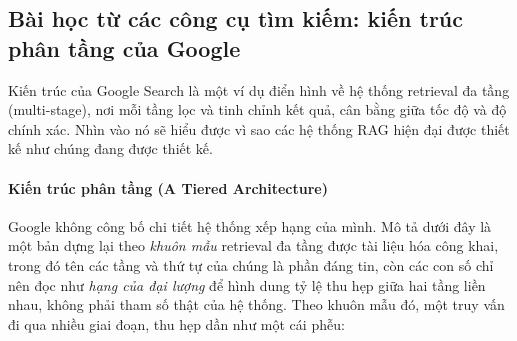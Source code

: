 \subsection{Bài học từ các công cụ tìm kiếm: kiến trúc phân tầng của Google}
\label{ssec:lesson_from_google}
Kiến trúc của Google Search là một ví dụ điển hình về hệ thống retrieval đa tầng (multi-stage), nơi mỗi tầng lọc và tinh chỉnh kết quả, cân bằng giữa tốc độ và độ chính xác. Nhìn vào nó sẽ hiểu được vì sao các hệ thống RAG hiện đại được thiết kế như chúng đang được thiết kế.

\paragraph{Kiến trúc phân tầng (A Tiered Architecture)}
Google không công bố chi tiết hệ thống xếp hạng của mình. Mô tả dưới đây là một bản dựng lại theo \textit{khuôn mẫu} retrieval đa tầng được tài liệu hóa công khai, trong đó tên các tầng và thứ tự của chúng là phần đáng tin, còn các con số chỉ nên đọc như \textit{hạng của đại lượng} để hình dung tỷ lệ thu hẹp giữa hai tầng liền nhau, không phải tham số thật của hệ thống. Theo khuôn mẫu đó, một truy vấn đi qua nhiều giai đoạn, thu hẹp dần như một cái phễu:
